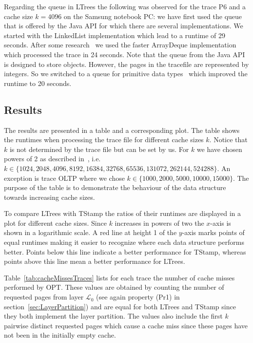 \documentclass[a4paper,12pt, titlepage]{article}  %
\newcommand{\cl}{\mathcal{L}}   %
\begin{document}
Regarding the queue in LTrees the following was observed for the trace P6 
and a cache size $k=4096$ on the Samsung notebook PC: we have first used
the queue that is offered by the Java API for which there are several implementations. 
We started with the LinkedList implementation which lead to a runtime of 29 seconds. 
After some research~\cite{queue_stackoverflow} we used the faster ArrayDeque implementation which
processed the trace in 24 seconds. 
Note that the queue from the Java API is designed to store objects. 
However, the pages in the tracefile are represented by integers.
So we switched to a queue for primitive data types~\cite{queue_primitive} which improved the 
runtime to 20 seconds. 

\newpage
\subsection{Results}
The results are presented in a table and a corresponding plot. The table shows the runtimes 
when processing the trace file for different cache sizes $k$. Notice that $k$ is not determined
by the trace file but can be set by us. For $k$ we have chosen powers of 2 as described 
in~\cite{arc_paper}, i.e. $k \in \{1024, 2048,4096,8192, 16384,32768,65536,131072, 262144, 524288 \}$. An exception 
is trace OLTP where we chose $k \in \{1000,2000,5000,10000,15000\}$.
The purpose of the table is to demonstrate the behaviour of the data structure towards increasing cache sizes. 

To compare LTrees with TStamp the ratios of their runtimes are displayed in a plot for 
different cache sizes. Since $k$ increases in powers of two the $x$-axis is shown in a logarithmic scale. 
A red line at height 1 of the $y$-axis marks points of equal runtimes making it easier to recognize where 
each data structure performs better. Points below this line indicate a better performance for TStamp, whereas
points above this line mean a better performance for LTrees.


Table~\ref{tab:cacheMissesTraces} lists for each trace the number of cache misses performed by OPT.  
These values are obtained by counting the number of requested pages from layer $\cl_0$
(see again property (Pr1) in section~\ref{sec:LayerPartition}) and are equal for both LTrees
and TStamp since they both implement the layer partition. The values also include the first $k$ pairwise 
distinct requested pages which cause a cache miss since these pages have not been in the initially empty cache.
\end{document}
